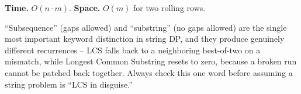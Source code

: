 \begin{complexitybox}
\textbf{Time.} $O(n \cdot m)$.
\textbf{Space.} $O(m)$ for two rolling rows.
\end{complexitybox}

\begin{takeawaybox}
``Subsequence'' (gaps allowed) and ``substring'' (no gaps allowed) are
the single most important keyword distinction in string DP, and they
produce genuinely different recurrences -- LCS falls back to a
neighboring best-of-two on a mismatch, while Longest Common Substring
resets to zero, because a broken run cannot be patched back together.
Always check this one word before assuming a string problem is ``LCS in
disguise.''
\end{takeawaybox}
